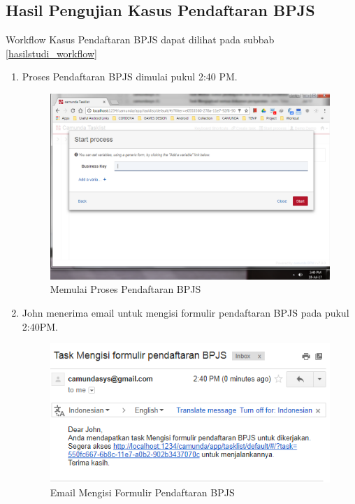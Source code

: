 \subsection{Hasil Pengujian Kasus Pendaftaran BPJS}
\label{pengujian_kasus2}
Workflow Kasus Pendaftaran BPJS dapat dilihat pada subbab \ref{hasilstudi_workflow}
\begin{enumerate}
	\item Proses Pendaftaran BPJS dimulai pukul 2:40 PM.
			\begin{figure}[H]
			\centering
			\includegraphics[scale=0.5]{Gambar/Bab-5/kasus2/1}
			\caption{Memulai Proses Pendaftaran BPJS} 
			\label{fig:pengujian_kasus2_1}
	\end{figure}
	

	\item John menerima email untuk mengisi formulir pendaftaran BPJS pada pukul 2:40PM.
			\begin{figure}[H]
			\centering
			\includegraphics[scale=0.8]{Gambar/Bab-5/kasus2/2}
			\caption{Email Mengisi Formulir Pendaftaran BPJS} 
			\label{fig:pengujian_kasus2_2}
	\end{figure}
	


\end{enumerate}
